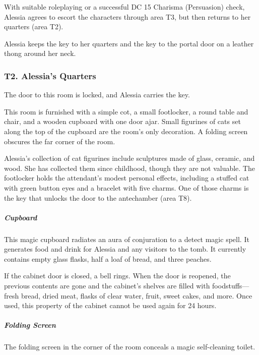 \documentclass[10pt,a4paper,twoside,bg=print,twocolumn,openany,nodeprecatedcode]{dndbook}
\begin{document}
With suitable roleplaying or a successful DC 15 Charisma (Persuasion) check, Alessia agrees to escort the characters through area T3, but then returns to her quarters (area T2).

Alessia keeps the key to her quarters and the key to the portal door on a leather thong around her neck.

\subsubsection{T2. Alessia's Quarters}
The door to this room is locked, and Alessia carries the key.

\begin{DndReadAloud}{}
This room is furnished with a simple cot, a small footlocker, a round table and chair, and a wooden cupboard with one door ajar. Small figurines of cats set along the top of the cupboard are the room's only decoration. A folding screen obscures the far corner of the room.

\end{DndReadAloud}

Alessia's collection of cat figurines include sculptures made of glass, ceramic, and wood. She has collected them since childhood, though they are not valuable. The footlocker holds the attendant's modest personal effects, including a stuffed cat with green button eyes and a bracelet with five charms. One of those charms is the key that unlocks the door to the antechamber (area T8).

\subparagraph{Cupboard}
This magic cupboard radiates an aura of conjuration to a detect magic spell. It generates food and drink for Alessia and any visitors to the tomb. It currently contains empty glass flasks, half a loaf of bread, and three peaches.

If the cabinet door is closed, a bell rings. When the door is reopened, the previous contents are gone and the cabinet's shelves are filled with foodstuffs—fresh bread, dried meat, flasks of clear water, fruit, sweet cakes, and more. Once used, this property of the cabinet cannot be used again for 24 hours.

\subparagraph{Folding Screen}
The folding screen in the corner of the room conceals a magic self-cleaning toilet.
\end{document}
